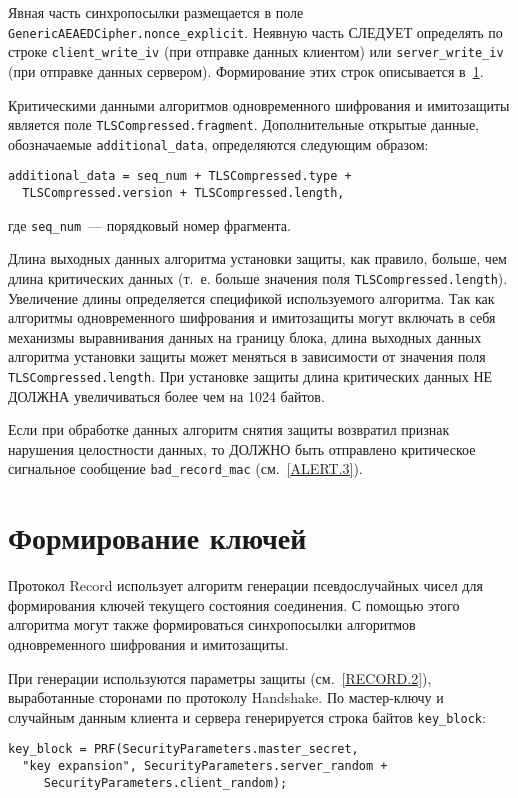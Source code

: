 Явная часть синхропосылки размещается в поле 
\lstinline{GenericAEAEDCipher.nonce_explicit}. Неявную часть СЛЕДУЕТ 
определять по строке \lstinline{client_write_iv} (при отправке данных 
клиентом) или \lstinline{server_write_iv} (при отправке данных сервером). 
Формирование этих строк описывается в~\ref{RECORD.4}.  

Критическими данными алгоритмов одновременного шифрования и имитозащиты 
является поле \lstinline{TLSCompressed.fragment}. Дополнительные открытые 
данные, обозначаемые \lstinline{additional_data}, определяются следующим 
образом:
\begin{lstlisting}
additional_data = seq_num + TLSCompressed.type + 
  TLSCompressed.version + TLSCompressed.length,
\end{lstlisting}
где \lstinline{seq_num}~--- порядковый номер фрагмента.

Длина выходных данных алгоритма установки защиты, как правило, больше, чем 
длина критических данных (т.~е. больше значения поля 
\lstinline{TLSCompressed.length}). Увеличение длины определяется спецификой 
используемого алгоритма. Так как алгоритмы одновременного шифрования и 
имитозащиты могут включать в себя механизмы выравнивания данных на 
границу блока, длина выходных данных алгоритма установки защиты может 
меняться в зависимости от значения поля \lstinline{TLSCompressed.length}. 
При установке защиты длина критических данных НЕ ДОЛЖНА увеличиваться 
более чем на 1024 байтов. 

Если при обработке данных алгоритм снятия защиты возвратил признак 
нарушения целостности данных, то ДОЛЖНО быть отправлено критическое 
сигнальное сообщение \lstinline{bad_record_mac} (см.~\ref{ALERT.3}). 

\section{Формирование ключей}\label{RECORD.4}

Протокол Record использует алгоритм генерации псевдослучайных чисел для 
формирования ключей текущего состояния соединения. С помощью этого 
алгоритма могут также формироваться синхропосылки алгоритмов 
одновременного шифрования и имитозащиты. 

При генерации используются параметры защиты (см.~\ref{RECORD.2}), выработанные 
сторонами по протоколу Handshake. По мастер-ключу и случайным данным 
клиента и сервера генерируется строка байтов \lstinline{key_block}: 
\begin{lstlisting}
key_block = PRF(SecurityParameters.master_secret, 
  "key expansion", SecurityParameters.server_random + 
     SecurityParameters.client_random);
\end{lstlisting}

